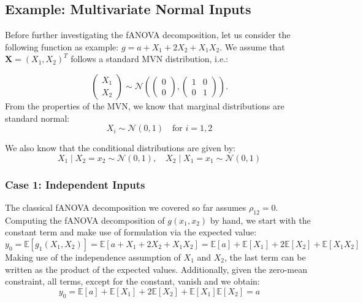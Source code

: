 \subsection{Example: Multivariate Normal Inputs}

Before further investigating the fANOVA decomposition, let us consider the following function as example: \(g = a + X_1 + 2X_2 + X_1 X_2\). We assume that $\boldsymbol{X} = (X_1, X_2)^T$ follows a standard MVN distribution, i.e.:

\[
\begin{pmatrix}
X_1 \\
X_2
\end{pmatrix}
\sim \mathcal{N}\left(
\begin{pmatrix} 0 \\ 0 \end{pmatrix},
\begin{pmatrix}
1 & 0 \\
0 & 1
\end{pmatrix}
\right).
\]
From the properties of the MVN, we know that marginal distributions are standard normal:
\[
X_i \sim \mathcal{N}(0, 1) \quad \text{for } i = 1, 2
\]

We also know that the conditional distributions are given by:
\[
X_1 \mid X_2 = x_2 \sim \mathcal{N}(0, 1), \quad
X_2 \mid X_1 = x_1 \sim \mathcal{N}(0, 1)
\]

\subsubsection*{Case 1: Independent Inputs}
The classical fANOVA decomposition we covered so far assumes $\rho_{12} = 0$. Computing the fANOVA decomposition of $g(x_1, x_2)$ by hand, we start with the constant term and make use of formulation via the expected value:
\[
y_0 = \mathbb{E}[g_{1}(X_1, X_2)] = \mathbb{E}[a + X_1 + 2X_2 + X_1X_2] = \mathbb{E}[a] + \mathbb{E}[X_1] + 2\mathbb{E}[X_2] + \mathbb{E}[X_1X_2]
\]
Making use of the independence assumption of $X_1$ and $X_2$, the last term can be written as the product of the expected values. Additionally, given the zero-mean constraint, all terms, except for the constant, vanish and we obtain:
\[
y_0 = \mathbb{E}[a] + \mathbb{E}[X_1] + 2\mathbb{E}[X_2] + \mathbb{E}[X_1]\mathbb{E}[X_2] = a
\]

